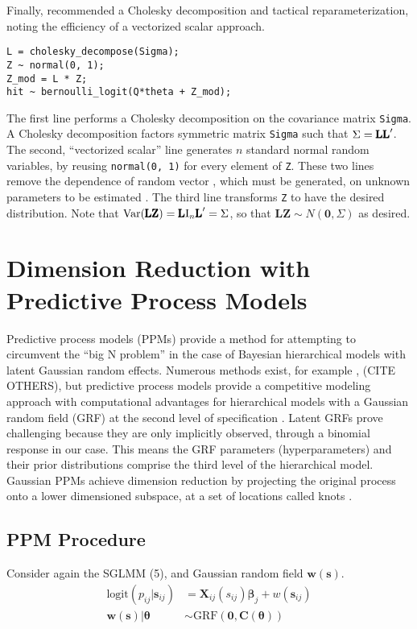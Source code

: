 Finally, \cite{Carpenter} recommended a Cholesky decomposition and tactical reparameterization, noting the efficiency of a vectorized scalar approach.
\begin{verbatim}
L = cholesky_decompose(Sigma);  
Z ~ normal(0, 1);  
Z_mod = L * Z; 
hit ~ bernoulli_logit(Q*theta + Z_mod);
\end{verbatim}
The first line performs a Cholesky decomposition on the covariance matrix \verb|Sigma|. A Cholesky decomposition factors symmetric matrix \verb|Sigma| such that $\Sigma = \text{\pmb{LL}}'$. The second, ``vectorized scalar'' line generates $n$ standard normal random variables, by reusing \verb|normal(0, 1)| for every element of \verb|Z|. These two lines remove the dependence of random vector , which must be generated, on unknown parameters to be estimated \cite{Trangucci2017}. The third line transforms \verb|Z| to have the desired distribution. Note that $\text{Var}(\text{\pmb{LZ}}) = \text{\pmb{L}} \text{I}_{n}\text{\pmb{L}}' = \Sigma$, so that $\pmb{LZ} \sim N(\pmb{0}, \Sigma)$ as desired.

\section{Dimension Reduction with Predictive Process Models} %

Predictive process models (PPMs) provide a method for attempting to circumvent the ``big N problem'' in the case of Bayesian hierarchical models with latent Gaussian random effects. Numerous methods exist, for example \citep{Cressie2008}, (CITE OTHERS), but predictive process models provide a competitive modeling approach with computational advantages for hierarchical models with a Gaussian random field (GRF) at the second level of specification \citep{Banerjee2008}. Latent GRFs prove challenging because they are only implicitly observed, through a binomial response in our case. This means the GRF parameters (hyperparameters) and their prior distributions comprise the third level of the hierarchical model. Gaussian PPMs achieve dimension reduction by projecting the original process onto a lower dimensioned subspace, at a set of locations called knots \citep{Banerjee2008}. 

\subsection{PPM Procedure}

Consider again the SGLMM (5), and Gaussian random field $\pmb{w}(\pmb{s})$.
\begin{align}
\text{logit}(p_{ij}|\pmb{s}_{ij}) &= \pmb{X}_{ij}(s_{ij}) \pmb{\beta}_{j} + w(\pmb{s}_{ij}) \\
\pmb{w}(\pmb{s}) | \pmb{\theta} &\sim \text{GRF}(\pmb{0}, \pmb{C}(\pmb{\theta}))
\end{align}

